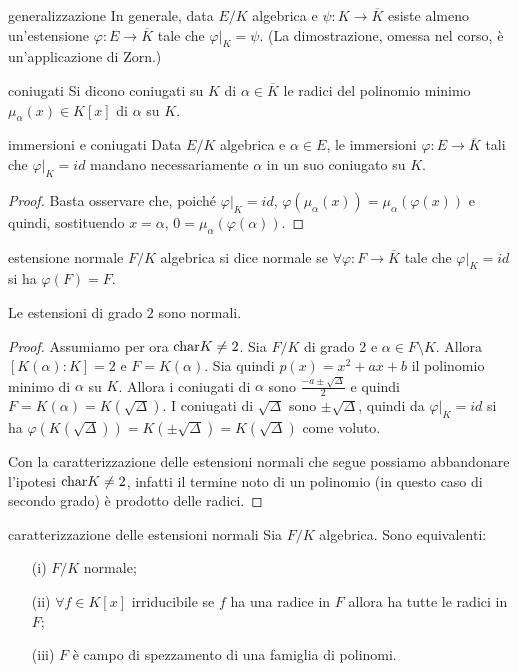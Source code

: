 \begin{proposition}{generalizzazione}
    In generale, data $E/K$ algebrica e $\psi : K \to \overline{K}$ esiste almeno un'estensione $\varphi : E \to \overline{K}$ tale che $\varphi|_K = \psi$. (La dimostrazione, omessa nel corso, è un'applicazione di Zorn.)
\end{proposition}
\begin{definition}{coniugati}
    Si dicono coniugati su $K$ di $\alpha \in \overline{K}$ le radici del polinomio minimo $\mu_{\alpha}(x) \in K[x]$ di $\alpha$ su $K$.
\end{definition}
\begin{proposition}{immersioni e coniugati}
    Data $E/K$ algebrica e $\alpha \in E$, le immersioni $\varphi: E \rightarrow \overline{K}$ tali che $\varphi|_K = id$ mandano necessariamente $\alpha$ in un suo coniugato su $K$.
\end{proposition}
\begin{proof}
 Basta osservare che, poiché $\varphi|_K = id$, $\varphi(\mu_{\alpha}(x)) =\mu_{\alpha}(\varphi(x)) $ e quindi, sostituendo $x = \alpha$, $0 = \mu_{\alpha}(\varphi(\alpha))$.
\end{proof}
\begin{definition}{estensione normale}
    $F/K$ algebrica si dice normale se $\forall \varphi: F \rightarrow \overline{K}$ tale che $\varphi|_K = id$ si ha $\varphi(F)=F$.
\end{definition}
\begin{proposition2}
    Le estensioni di grado $2$ sono normali.
\end{proposition2}
\begin{proof}
    Assumiamo per ora $\text{char} K \neq 2$. Sia $F/K$ di grado 2 e $\alpha \in F \setminus K$. Allora $[K(\alpha):K] = 2$ e $F = K(\alpha)$. Sia quindi $p(x) = x^2 + ax+b$ il polinomio minimo di $\alpha$ su $K$. Allora i coniugati di $\alpha$ sono $\frac{-a\pm\sqrt{\Delta}}{2}$ e quindi $F = K(\alpha) = K(\sqrt{\Delta})$. I coniugati di $\sqrt{\Delta}$ sono $\pm\sqrt{\Delta}$, quindi da $\varphi|_K = id$ si ha $\varphi(K(\sqrt{\Delta})) = K(\pm\sqrt{\Delta}) = K(\sqrt{\Delta})$ come voluto.

    Con la caratterizzazione delle estensioni normali che segue possiamo abbandonare l'ipotesi $\text{char} K \neq 2$, infatti il termine noto di un polinomio (in questo caso di secondo grado) è prodotto delle radici.
\end{proof}
\begin{theorem}{caratterizzazione delle estensioni normali}
    Sia $F/K$ algebrica. Sono equivalenti: 
    \begin{itemize}
        \item[(i)] $F/K$ normale;
        \item[(ii)] $\forall f \in K[x]$ irriducibile se $f$ ha una radice in $F$ allora ha tutte le radici in $F$;
        \item[(iii)] $F$ è campo di spezzamento di una famiglia di polinomi.
    \end{itemize}
\end{theorem}
